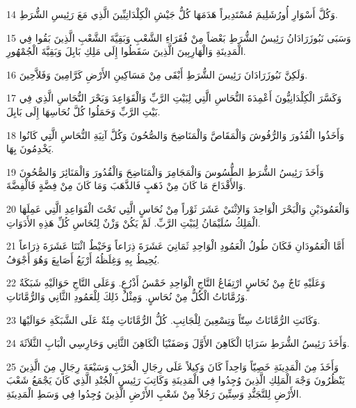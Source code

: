 \par 14 وَكُلَّ أَسْوَارِ أُورُشَلِيمَ مُسْتَدِيراً هَدَمَهَا كُلُّ جَيْشِ الْكِلْدَانِيِّينَ الَّذِي مَعَ رَئِيسِ الشُّرَطِ.
\par 15 وَسَبَى نَبُوزَرَادَانُ رَئِيسُ الشُّرَطِ بَعْضاً مِنْ فُقَرَاءِ الشَّعْبِ وَبَقِيَّةَ الشَّعْبِ الَّذِينَ بَقُوا فِي الْمَدِينَةِ وَالْهَارِبِينَ الَّذِينَ سَقَطُوا إِلَى مَلِكِ بَابِلَ وَبَقِيَّةَ الْجُمْهُورِ.
\par 16 وَلَكِنَّ نَبُوزَرَادَانَ رَئِيسَ الشُّرَطِ أَبْقَى مِنْ مَسَاكِينِ الأَرْضِ كَرَّامِينَ وَفَلاَّحِينَ.
\par 17 وَكَسَّرَ الْكِلْدَانِيُّونَ أَعْمِدَةَ النُّحَاسِ الَّتِي لِبَيْتِ الرَّبِّ وَالْقَوَاعِدَ وَبَحْرَ النُّحَاسِ الَّذِي فِي بَيْتِ الرَّبِّ وَحَمَلُوا كُلَّ نُحَاسِهَا إِلَى بَابِلَ.
\par 18 وَأَخَذُوا الْقُدُورَ وَالرُّفُوشَ وَالْمَقَاصَّ وَالْمَنَاضِحَ وَالصُّحُونَ وَكُلَّ آنِيَةِ النُّحَاسِ الَّتِي كَانُوا يَخْدِمُونَ بِهَا.
\par 19 وَأَخَذَ رَئِيسُ الشُّرَطِ الطُّسُوسَ وَالْمَجَامِرَ وَالْمَنَاضِحَ وَالْقُدُورَ وَالْمَنَائِرَ وَالصُّحُونَ وَالأَقْدَاحَ مَا كَانَ مِنْ ذَهَبٍ فَالذَّهَبَ وَمَا كَانَ مِنْ فِضَّةٍ فَالْفِضَّةَ.
\par 20 وَالْعَمُودَيْنِ وَالْبَحْرَ الْوَاحِدَ وَالاِثْنَيْ عَشَرَ ثَوْراً مِنْ نُحَاسٍ الَّتِي تَحْتَ الْقَوَاعِدِ الَّتِي عَمِلَهَا الْمَلِكُ سُلَيْمَانُ لِبَيْتِ الرَّبِّ. لَمْ يَكُنْ وَزْنٌ لِنُحَاسِ كُلِّ هَذِهِ الأَدَوَاتِ.
\par 21 أَمَّا الْعَمُودَانِ فَكَانَ طُولُ الْعَمُودِ الْوَاحِدِ ثَمَانِيَ عَشَرَةَ ذِرَاعاً وَخَيْطٌ اثْنَتَا عَشَرَةَ ذِرَاعاً يُحِيطُ بِهِ وَغِلَظُهُ أَرْبَعُ أَصَابِعَ وَهُوَ أَجْوَفُ.
\par 22 وَعَلَيْهِ تَاجٌ مِنْ نُحَاسٍ ارْتِفَاعُ التَّاجِ الْوَاحِدِ خَمْسُ أَذْرُعٍ. وَعَلَى التَّاجِ حَوَالَيْهِ شَبَكَةٌ وَرُمَّانَاتُ الْكُلُّ مِنْ نُحَاسٍ. وَمِثْلُ ذَلِكَ لِلْعَمُودِ الثَّانِي وَالرُّمَّانَاتِ.
\par 23 وَكَانَتِ الرُّمَّانَاتُ سِتّاً وَتِسْعِينَ لِلْجَانِبِ. كُلُّ الرُّمَّانَاتِ مِئَةٌ عَلَى الشَّبَكَةِ حَوَالَيْهَا.
\par 24 وَأَخَذَ رَئِيسُ الشُّرَطِ سَرَايَا الْكَاهِنَ الأَوَّلَ وَصَفَنْيَا الْكَاهِنَ الثَّانِي وَحَارِسِي الْبَابِ الثَّلاَثَةَ.
\par 25 وَأَخَذَ مِنَ الْمَدِينَةِ خَصِيّاً وَاحِداً كَانَ وَكِيلاً عَلَى رِجَالِ الْحَرْبِ وَسَبْعَةَ رِجَالٍ مِنَ الَّذِينَ يَنْظُرُونَ وَجْهَ الْمَلِكِ الَّذِينَ وُجِدُوا فِي الْمَدِينَةِ وَكَاتِبَ رَئِيسِ الْجُنْدِ الَّذِي كَانَ يَجْمَعُ شَعْبَ الأَرْضِ لِلتَّجَنُّدِ وَسِتِّينَ رَجُلاً مِنْ شَعْبِ الأَرْضِ الَّذِينَ وُجِدُوا فِي وَسَطِ الْمَدِينَةِ.
